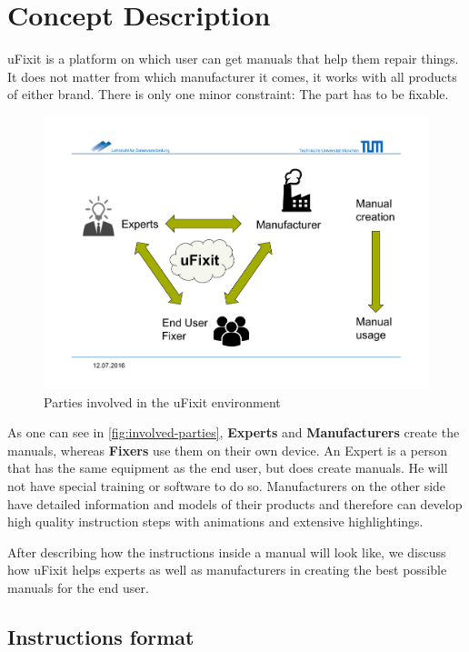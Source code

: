 
\chapter{Concept Description}

	uFixit is a platform on which user can get manuals that help them repair things. It does not matter from which manufacturer it comes, it works with all products of either brand. There is only one minor constraint: The part has to be fixable.
	
	\begin{figure}[H]
		\includegraphics[width=\textwidth, trim=0cm 3cm 0cm 4cm, clip]{../images/involved-parties.pdf}
		\centering
		\caption{Parties involved in the uFixit environment}
		\label{fig:involved-parties}
	\end{figure}
	
	As one can see in \autoref{fig:involved-parties}, \textbf{Experts} and \textbf{Manufacturers} create the manuals, whereas \textbf{Fixers} use them on their own device. An Expert is a person that has the same equipment as the end user, but does create manuals. He will not have special training or software to do so. Manufacturers on the other side have detailed information and models of their products and therefore can develop high quality instruction steps with animations and extensive highlightings.
	
	After describing how the instructions inside a manual will look like, we discuss how uFixit helps experts as well as manufacturers in creating the best possible manuals for the end user.


	\section{Instructions format}
	
